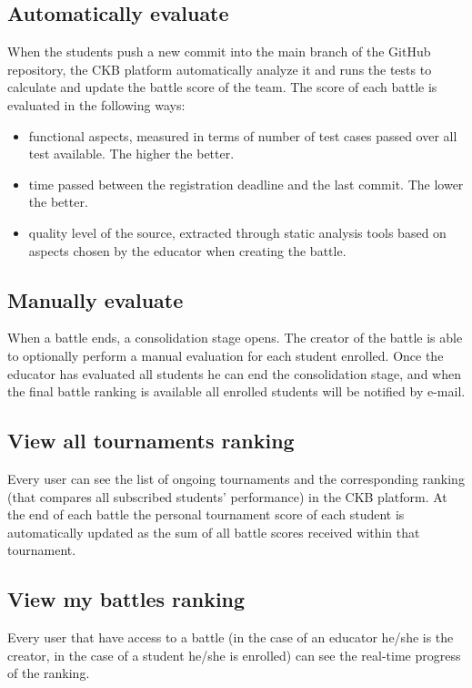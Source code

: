 \subsection{Automatically evaluate}
When the students push a new commit into the main branch of the GitHub repository, the CKB platform automatically analyze it and runs the tests to calculate and update the battle score of the team.\newline
The score of each battle is evaluated in the following ways:
\begin{itemize}
        \item functional aspects, measured in terms of number of test cases passed over all test available. The higher the better.
        \item time passed between the registration deadline and the last commit. The lower the better.
        \item quality level of the source, extracted through static analysis tools based on aspects chosen by the educator when creating the battle. 
\end{itemize}

\subsection{Manually evaluate}
When a battle ends, a consolidation stage opens. The creator of the battle is able to optionally perform a manual evaluation for each student enrolled.
Once the educator has evaluated all students he can end the consolidation stage, and when the final battle ranking is available all enrolled students will be notified by e-mail.

\subsection{View all tournaments ranking}
Every user can see the list of ongoing tournaments and the corresponding ranking (that compares all subscribed students' performance) in the CKB platform.
At the end of each battle the personal tournament score of each student is automatically updated as the sum of all battle scores received within that tournament. 

\subsection{View my battles ranking}
Every user that have access to a battle (in the case of an educator he/she is the creator, in the case of a student he/she is enrolled) can see the real-time progress of the ranking. 

